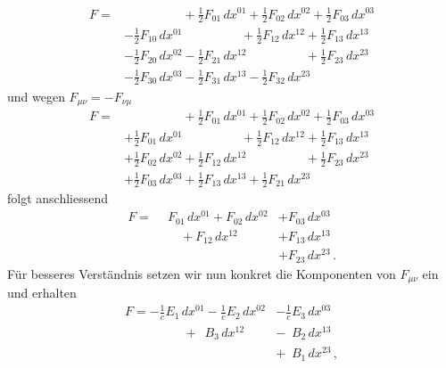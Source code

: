 \begin{align*}
	F
	=
	&\phantom{+ \frac{1}{2} F_{00} \, dx^{00}} + \frac{1}{2} F_{01} \, dx^{01} + \frac{1}{2} F_{02} \, dx^{02} + \frac{1}{2} F_{03} \, dx^{03}
	\\
	&- \frac{1}{2} F_{10} \, dx^{01} \phantom{+ \frac{1}{2} F_{11} \, dx^{11}} + \frac{1}{2} F_{12} \, dx^{12} + \frac{1}{2} F_{13} \, dx^{13}
	\\
	&- \frac{1}{2} F_{20} \, dx^{02} - \frac{1}{2} F_{21} \, dx^{12} \phantom{+ \frac{1}{2} F_{22} \, dx^{22}} + \frac{1}{2} F_{23} \, dx^{23}
	\\
	&- \frac{1}{2} F_{30} \, dx^{03} - \frac{1}{2} F_{31} \, dx^{13} - \frac{1}{2} F_{32} \, dx^{23} \phantom{+ \frac{1}{2} F_{33} \, dx^{33}}
\end{align*}
und wegen $F_{\mu\nu} = -F_{\nu\mu}$
\begin{align*}
	F
	=
	&\phantom{+ \frac{1}{2} F_{00} \, dx^{00}} + \frac{1}{2} F_{01} \, dx^{01} + \frac{1}{2} F_{02} \, dx^{02} + \frac{1}{2} F_{03} \, dx^{03}
	\\
	&+ \frac{1}{2} F_{01} \, dx^{01} \phantom{+ \frac{1}{2} F_{11} \, dx^{11}} + \frac{1}{2} F_{12} \, dx^{12} + \frac{1}{2} F_{13} \, dx^{13}
	\\
	&+ \frac{1}{2} F_{02} \, dx^{02} + \frac{1}{2} F_{12} \, dx^{12} \phantom{+ \frac{1}{2} F_{22} \, dx^{22}} + \frac{1}{2} F_{23} \, dx^{23}
	\\
	&+ \frac{1}{2} F_{03} \, dx^{03} + \frac{1}{2} F_{13} \, dx^{13} + \frac{1}{2} F_{21} \, dx^{23} \phantom{+ \frac{1}{2} F_{33} \, dx^{33}}
\end{align*}
folgt anschliessend
\begin{align*}
	F
	=
	\phantom{+} F_{01} \, dx^{01} + F_{02} \, dx^{02} &+ F_{03} \, dx^{03}
	\\
	\phantom{+ F_{11} \, dx^{11}} + F_{12} \, dx^{12} &+ F_{13} \, dx^{13}
	\\
	\phantom{+ F_{12} \, dx^{12}} \phantom{+ F_{22} \, dx^{22}} &+ F_{23} \, dx^{23} \, .
\end{align*}
Für besseres Verständnis setzen wir nun konkret die Komponenten von $F_{\mu\nu}$ ein und erhalten
\begin{align*}
	F
	=
	- \frac{1}{c} E_1 \, dx^{01} - \frac{1}{c} E_2 \, dx^{02} &- \frac{1}{c} E_3 \, dx^{03}
	\\
	\phantom{+ \frac{1}{c} F_{11} \, dx^{11}} + \phantom{\frac{1}{c}} B_3 \, dx^{12} &- \phantom{\frac{1}{c}} B_2 \, dx^{13}
	\\
	\phantom{+ \frac{1}{c} F_{12} \, dx^{12}} \phantom{+ \frac{1}{c} F_{22} \, dx^{22}} &+ \phantom{\frac{1}{c}} B_1 \, dx^{23} \, ,
\end{align*}

